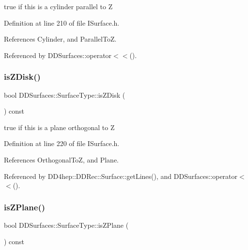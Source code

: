 true if this is a cylinder parallel to Z 



Definition at line 210 of file I\+Surface.\+h.



References Cylinder, and Parallel\+ToZ.



Referenced by D\+D\+Surfaces\+::operator$<$$<$().

\hypertarget{class_d_d_surfaces_1_1_surface_type_af681afe8bbb11a18a888280b36551897}{}\label{class_d_d_surfaces_1_1_surface_type_af681afe8bbb11a18a888280b36551897} 
\subsubsection{\texorpdfstring{is\+Z\+Disk()}{isZDisk()}}
{\footnotesize\ttfamily bool D\+D\+Surfaces\+::\+Surface\+Type\+::is\+Z\+Disk (\begin{DoxyParamCaption}{ }\end{DoxyParamCaption}) const\hspace{0.3cm}{\ttfamily [inline]}}



true if this is a plane orthogonal to Z 



Definition at line 220 of file I\+Surface.\+h.



References Orthogonal\+ToZ, and Plane.



Referenced by D\+D4hep\+::\+D\+D\+Rec\+::\+Surface\+::get\+Lines(), and D\+D\+Surfaces\+::operator$<$$<$().

\hypertarget{class_d_d_surfaces_1_1_surface_type_a425b616b625d4f5d6ebceba38cbb7c0c}{}\label{class_d_d_surfaces_1_1_surface_type_a425b616b625d4f5d6ebceba38cbb7c0c} 
\subsubsection{\texorpdfstring{is\+Z\+Plane()}{isZPlane()}}
{\footnotesize\ttfamily bool D\+D\+Surfaces\+::\+Surface\+Type\+::is\+Z\+Plane (\begin{DoxyParamCaption}{ }\end{DoxyParamCaption}) const\hspace{0.3cm}{\ttfamily [inline]}}



